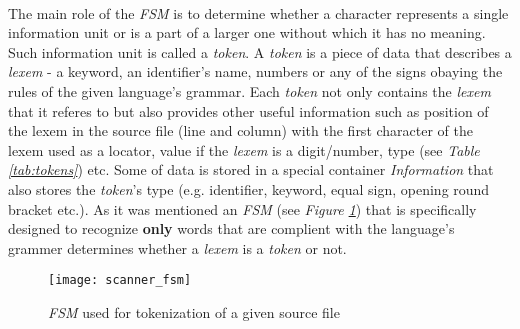   	\paragraph{}
  	    The main role of the \textit{FSM} is to determine whether a character represents a single information unit or is a part of a larger one without which it has no meaning. Such information unit is called a \textit{token}. A \textit{token} is a piece of data that describes a \textit{lexem} - a keyword, an identifier's name, numbers or any of the signs obaying the rules of the given language's grammar. Each \textit{token} not only contains the \textit{lexem} that it referes to but also provides other useful information such as position of the lexem in the source file (line and column) with the first character of the lexem used as a locator, value if the \textit{lexem} is a digit/number, type (see \textit{Table \ref{tab:tokens}}) etc. Some of data is stored in a special container \textit{Information} that also stores the \textit{token}'s type (e.g. identifier, keyword, equal sign, opening round bracket etc.). As it was mentioned an \textit{FSM} (see \textit{Figure \ref{fig:fsm}}) that is specifically designed to recognize \textbf{only} words that are complient with the language's grammer determines whether a \textit{lexem} is a \textit{token} or not.\\
    \begin{figure}
    		\centering
    		\label{fig:fsm}
    		\texttt{[image: scanner\_fsm]}
    		\caption{\textit{FSM} used for tokenization of a given source file}
    \end{figure}
    
